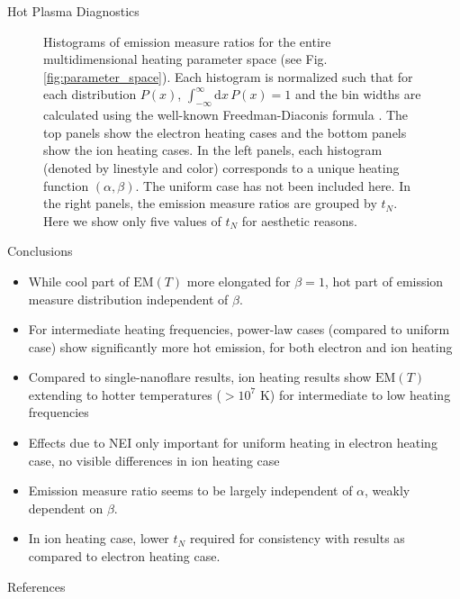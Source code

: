 \documentclass[final]{beamer}
\begin{document}
\begin{frame}
\begin{columns}[T]
\begin{column}{0.49\linewidth}
\begin{block}{Hot Plasma Diagnostics}
\begin{figure}
{        \label{fig:ratio_ion_twait}}
        \caption{Histograms of emission measure ratios for the entire multidimensional heating parameter space (see Fig. \ref{fig:parameter_space}). Each histogram is normalized such that for each distribution $P(x)$, $\int^{\infty}_{-\infty}\mathrm{d}x\,P(x)=1$ and the bin widths are calculated using the well-known Freedman-Diaconis formula \citep{freedman_histogram_1981}. The top panels show the electron heating cases and the bottom panels show the ion heating cases. In the left panels, each histogram (denoted by linestyle and color) corresponds to a unique heating function $(\alpha,\beta)$. The uniform case has not been included here. In the right panels, the emission measure ratios are grouped by $t_N$. Here we show only five values of $t_N$ for aesthetic reasons.}
      \end{figure}
      \vspace{-2ex}
    \end{block}
    \begin{block}{Conclusions}
      \vspace{-1ex}
      \begin{itemize}
        \item While cool part of $\mathrm{EM}(T)$ more elongated for $\beta=1$, \alert{hot part of emission measure distribution independent of $\beta$}.
        \item For intermediate heating frequencies, power-law cases (compared to uniform case) show significantly more hot emission, for both electron and ion heating
        \item Compared to single-nanoflare results, ion heating results show $\mathrm{EM}(T)$ extending to hotter temperatures ($>10^7$ K) for intermediate to low heating frequencies
        \item \alert{Effects due to NEI only important for uniform heating in electron heating case}, no visible differences in ion heating case
        \item Emission measure ratio seems to be largely independent of $\alpha$, weakly dependent on $\beta$.
        \item \alert{In ion heating case, lower $t_N$ required for consistency with \citet{brosius_pervasive_2014} results as compared to electron heating case}.
      \end{itemize}
      \vspace{-1ex}
    \end{block}
    \begin{block}{References}

\end{block}
\end{column}
\end{columns}
\end{frame}
\end{document}
